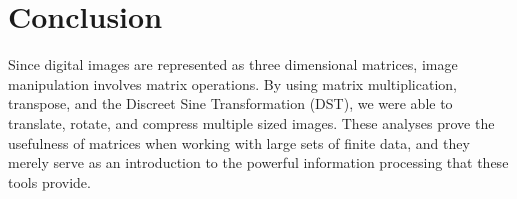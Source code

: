 \section{Conclusion}
Since digital images are represented as three dimensional matrices, image manipulation involves matrix operations. By using matrix multiplication, transpose, and the Discreet Sine Transformation (DST), we were able to translate, rotate, and compress multiple sized images. These analyses prove the usefulness of matrices when working with large sets of finite data, and they merely serve as an introduction to the powerful information processing that these tools provide.
